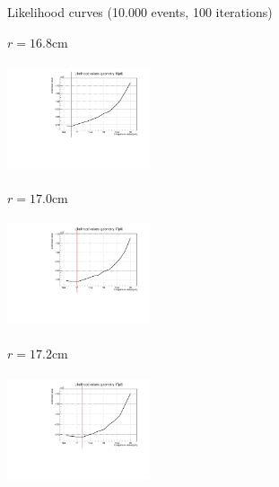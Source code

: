 \documentclass[handout,8 pt]{beamer}
\begin{document}
\begin{frame}{Likelihood curves (10.000 events, 100 iterations)}
\justifying
\begin{minipage}[c]{.32\textwidth}
\begin{exampleblock}{} \begin{center}$r = 16.8$cm\end{center} \end{exampleblock}
\includegraphics[width=4.2cm, height=3.2cm]{figs/likelihood100LowStat/likelihood16p8.pdf} 
\end{minipage}
\begin{minipage}[c]{.32\textwidth}
\begin{exampleblock}{} \begin{center}$r = 17.0$cm\end{center} \end{exampleblock}
\includegraphics[width=4.2cm, height=3.2cm]{figs/likelihood100LowStat/likelihood17p0.pdf} 
\end{minipage}
\begin{minipage}[c]{.32\textwidth}
\begin{exampleblock}{} \begin{center}$r = 17.2$cm\end{center} \end{exampleblock}
\includegraphics[width=4.2cm, height=3.2cm]{figs/likelihood100LowStat/likelihood17p2.pdf} 
\end{minipage}


\end{frame}
\end{document}

